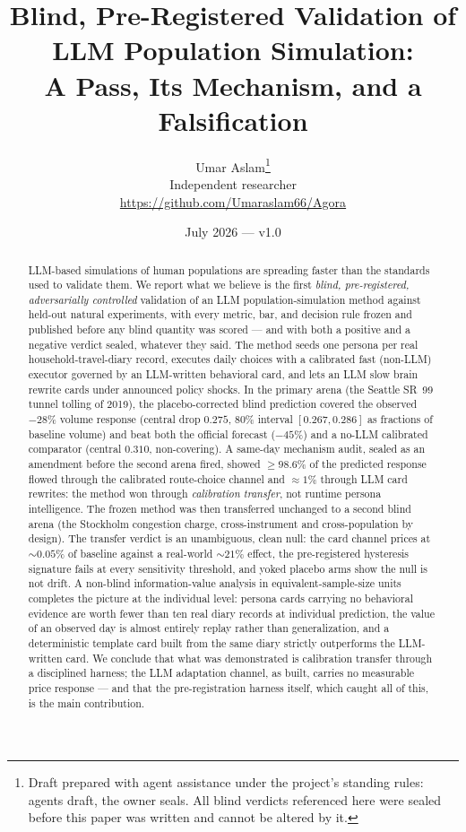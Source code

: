 \documentclass[11pt]{article}
\title{\bfseries Blind, Pre-Registered Validation of LLM Population
Simulation:\\ A Pass, Its Mechanism, and a Falsification}
\author{Umar Aslam\thanks{Draft prepared with agent assistance under the
project's standing rules: agents draft, the owner seals. All blind
verdicts referenced here were sealed before this paper was written and
cannot be altered by it.}\\[2pt]
{\small Independent researcher}\\
{\small \url{https://github.com/Umaraslam66/Agora}}}
\date{July 2026 --- v1.0}
\begin{document}
\maketitle

\begin{abstract}
\noindent
LLM-based simulations of human populations are spreading faster than the
standards used to validate them. We report what we believe is the first
\emph{blind, pre-registered, adversarially controlled} validation of an
LLM population-simulation method against held-out natural experiments,
with every metric, bar, and decision rule frozen and published before
any blind quantity was scored --- and with both a positive and a negative
verdict sealed, whatever they said. The method seeds one persona per real
household-travel-diary record, executes daily choices with a calibrated
fast (non-LLM) executor governed by an LLM-written behavioral card, and
lets an LLM slow brain rewrite cards under announced policy shocks. In
the primary arena (the Seattle SR~99 tunnel tolling of 2019), the
placebo-corrected blind prediction covered the observed $-28\%$ volume
response (central drop $0.275$, 80\% interval $[0.267, 0.286]$ as
fractions of baseline volume) and beat both the official forecast
($-45\%$) and a no-LLM calibrated comparator (central $0.310$,
non-covering). A same-day mechanism audit, sealed as an
amendment before the second arena fired, showed $\geq 98.6\%$ of the
predicted response flowed through the calibrated route-choice channel and
$\approx 1\%$ through LLM card rewrites: the method won through
\emph{calibration transfer}, not runtime persona intelligence. The frozen
method was then transferred unchanged to a second blind arena (the
Stockholm congestion charge, cross-instrument and cross-population by
design). The transfer verdict is an unambiguous, clean null: the card
channel prices at $\sim 0.05\%$ of baseline against a real-world
$\sim 21\%$ effect, the pre-registered hysteresis signature fails at
every sensitivity threshold, and yoked placebo arms show the null is not
drift. A non-blind information-value analysis in equivalent-sample-size
units completes the picture at the individual level: persona cards
carrying no behavioral evidence are worth fewer than ten real diary
records at individual prediction, the value of an observed day is almost
entirely replay rather than generalization, and a deterministic template
card built from the same diary strictly outperforms the LLM-written
card. We conclude that what was
demonstrated is calibration transfer through a disciplined harness; the
LLM adaptation channel, as built, carries no measurable price response
--- and that the pre-registration harness itself, which caught all of
this, is the main contribution.
\end{abstract}
\end{document}
